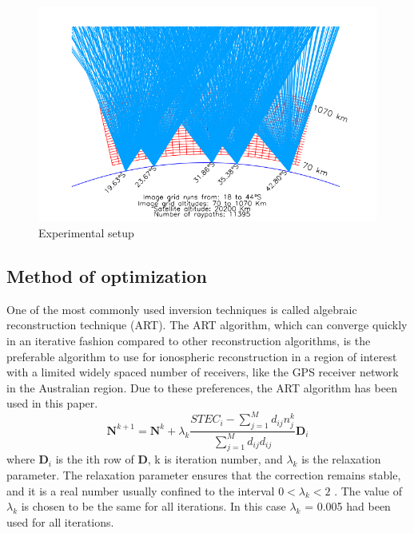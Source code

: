 \documentclass[12pt]{article}
\begin{document}
\begin{figure}[H]
  \centering
  \includegraphics[scale=0.75]{tomo.png}  %
  \caption{Experimental setup}
  \label{fig:1}
\end{figure}
\subsection*{Method of optimization}
One of the most commonly used inversion techniques is called algebraic reconstruction technique (ART). The ART algorithm, which can converge quickly in an iterative fashion compared to other reconstruction algorithms, is the preferable algorithm to use for ionospheric reconstruction in a region of interest with a limited widely spaced number of receivers, like the GPS receiver network in the Australian region. Due to these
preferences, the ART algorithm has been used in this paper.
\begin{equation*}
    \boldsymbol{N}^{k+1} = \boldsymbol{N}^{k} + \lambda_k\frac{STEC_i - \sum_{j=1}^Md_{ij}n_j^k}{\sum_{j=1}^Md_{ij}d_{ij}}\boldsymbol{D}_i
\end{equation*}
where $\boldsymbol{D}_i$ is the ith row of $\boldsymbol{D}$, k is iteration number, and $\lambda_k$ is the relaxation parameter. The relaxation parameter ensures that the correction remains stable, and it is a real number usually confined to the interval $0 < \lambda_k < 2$ . The value of $\lambda_k$ is chosen to be the same for all iterations. In this case $\lambda_k$ = 0.005 had been used for all iterations.
\end{document}
